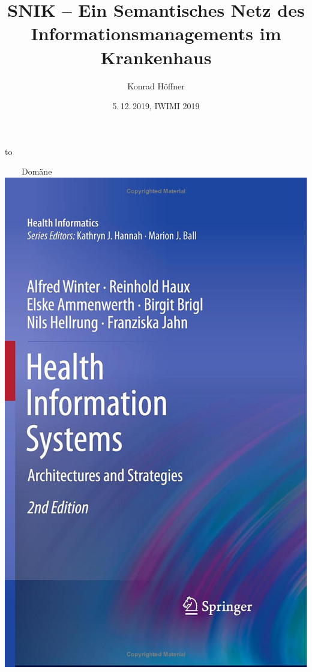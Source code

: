 \documentclass[aspectratio=1610,12pt]{beamer}
\author{Konrad Höffner}%
\title{\Large SNIK -- Ein Semantisches Netz des Informationsmanagements im Krankenhaus}
\subtitle{}
\date{5.\,12.\,2019, IWIMI 2019}
\begin{document}
{
%
{
 \vbox to 
}
\begin{frame}
\titlepage
\end{frame}
}

\begin{frame}[plain]{~~~~Domäne}
\centering\includegraphics[height=0.77\textheight,keepaspectratio]{img/book-bb.jpg}

\end{frame}
\end{document}
